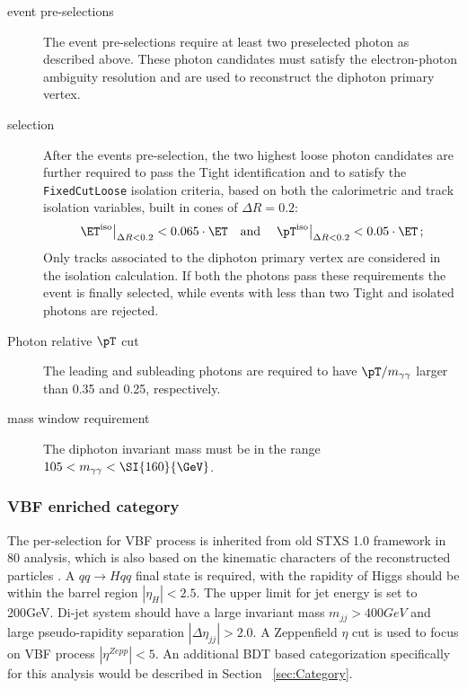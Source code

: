 \begin{description}
	\item[\yy event pre-selections]
	
	The \yy event pre-selections require at least two preselected photon as described above. These photon candidates must satisfy the electron-photon ambiguity resolution and are used to reconstruct the diphoton primary vertex.
	
	\item[\yy selection]
	After the events pre-selection, the two highest \pT loose photon candidates are further required to pass the Tight identification
	and to satisfy the \texttt{FixedCutLoose} isolation criteria, based on both the calorimetric and track
	isolation variables, built in cones of $\Delta R = 0.2$:
	\[
	\left.\ET^\text{iso}\right|_{\Delta R<0.2}<0.065\cdot\ET \quad \text{and}\quad \left.\pT^\text{iso}\right|_{\Delta R<0.2}<0.05\cdot\ET \,;
	\label{eq:FixedCutLoose}
	\]
	Only tracks associated to the diphoton primary vertex are considered in the isolation calculation. If both the photons pass these requirements the event is finally selected, while events with less than two Tight and isolated photons are rejected.
	
	\item[Photon relative $\pT$ cut] The leading and subleading photons are required to have $\pT/\myy$ larger than 0.35 and 0.25, respectively.
	
	\item[\myy mass window requirement] The diphoton invariant mass must be in the range $105<\myy<\SI{160}{\GeV}$.
	
\end{description}

\subsubsection{VBF enriched category}

The per-selection for VBF process is inherited from old STXS 1.0 framework in 80 \ifb analysis, which is also based on the kinematic characters of the reconstructed particles \cite{ATLAS-CONF-2018-028}. A $qq\to Hqq$ final state is required, with the rapidity of Higgs should be within the barrel region $|\eta_{H}|<2.5$. The upper limit for jet energy is set to 200GeV. Di-jet system should have a large invariant mass $m_{jj}>400GeV$ and large pseudo-rapidity separation $|\Delta \eta_{jj}|>2.0$. A Zeppenfield $\eta$  cut is used to focus on VBF process $|\eta^{Zepp}|<5$. An additional BDT based categorization specifically for this analysis would be described in Section ~\ref{sec:Category}. 



